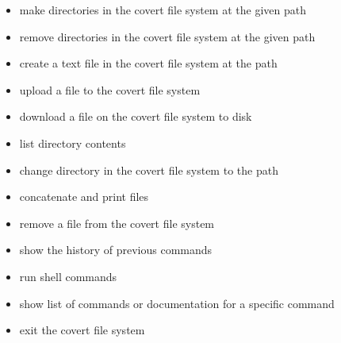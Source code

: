 \documentclass[letterpaper,12pt,openany,oneside]{sphinxmanual}
\begin{document}
\begin{itemize}
\begin{itemize}
\item {} 
 make directories in the covert file system at the given path

\item {} 
 remove directories in the covert file system at the given path

\item {} 
 create a text file in the covert file system at the path

\item {} 
 upload a file to the covert file system

\item {} 
 download a file on the covert file system to disk

\item {} 
 list directory contents

\item {} 
 change directory in the covert file system to the path

\item {} 
 concatenate and print files

\item {} 
 remove a file from the covert file system

\item {} 
 show the history of previous commands

\item {} 
 run shell commands

\item {} 
 show list of commands or documentation for a specific command

\item {} 
 exit the covert file system

\end{itemize}

\end{itemize}
\end{document}
